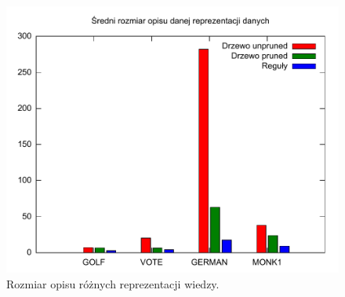 \begin{figure}
	\includegraphics[scale=0.7]{gnuplot/compare-sizes.pdf} 
	\caption{Rozmiar opisu różnych reprezentacji wiedzy.}
	\label{p2t2-compare-sizes}
\end{figure}
